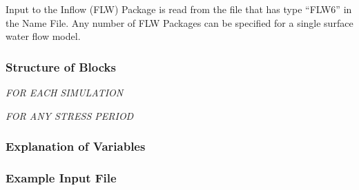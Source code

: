 Input to the Inflow (FLW) Package is read from the file that has type ``FLW6'' in the Name File.  Any number of FLW Packages can be specified for a single surface water flow model.

\vspace{5mm}
\subsubsection{Structure of Blocks}
\vspace{5mm}

\noindent \textit{FOR EACH SIMULATION}


\vspace{5mm}
\noindent \textit{FOR ANY STRESS PERIOD}

\packageperioddescription

\vspace{5mm}
\subsubsection{Explanation of Variables}
\begin{description}

\end{description}

\vspace{5mm}
\subsubsection{Example Input File}



